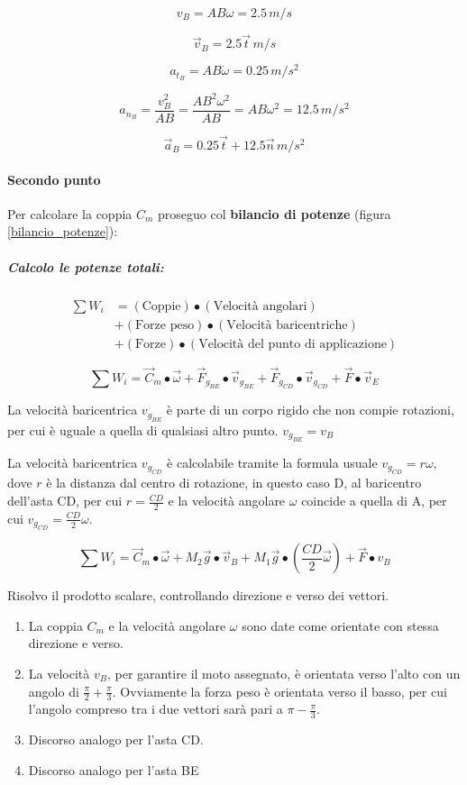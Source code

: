 \documentclass[main.tex]{subfiles}
\begin{document}
\[
  v_B = AB\omega = 2.5\,m/s
\]

\[
  \vec{v}_B = 2.5\vec{t}\,m/s
\]

\[
  a_{t_B} = AB\dot{\omega} = 0.25\,m/s^2
\]

\[
  a_{n_B} = \frac{v_B^2}{AB} = \frac{AB^2\omega^2}{AB} = AB\omega^2 = 12.5\,m/s^2
\]

\[
  \vec{a}_B = 0.25\vec{t} + 12.5\vec{n}\,m/s^2
\]

\paragraph{Secondo punto}
Per calcolare la coppia $C_m$ proseguo col \textbf{bilancio di potenze} (figura \ref{bilancio_potenze}):

\subparagraph{Calcolo le potenze totali:}

\begin{align*}
  \sum W_i &= (\text{Coppie})\bullet(\text{Velocità angolari})\\
  &+ (\text{Forze peso})\bullet(\text{Velocità baricentriche}) \\
  &+ (\text{Forze})\bullet(\text{Velocità del punto di applicazione})
\end{align*}

\[
  \sum W_i = \vec{C}_m\bullet\vec{\omega} + \vec{F}_{g_{BE}}\bullet \vec{v}_{g_{BE}} + \vec{F}_{g_{CD}}\bullet \vec{v}_{g_{CD}} + \vec{F}\bullet \vec{v}_E
\]

La velocità baricentrica $v_{g_{BE}}$ è parte di un corpo rigido che non compie rotazioni, per cui è uguale a quella di qualsiasi altro punto. $v_{g_{BE}} = v_B$

La velocità baricentrica $v_{g_{CD}}$ è calcolabile tramite la formula usuale $v_{g_{CD}} = r\omega$, dove $r$ è la distanza dal centro di rotazione, in questo caso D, al baricentro dell'asta CD, per cui $r = \frac{CD}{2}$ e la velocità angolare $\omega$ coincide a quella di A, per cui $v_{g_{CD}} = \frac{CD}{2}\omega$.

\[
  \sum W_i = \vec{C}_m\bullet\vec{\omega} + M_2\vec{g}\bullet \vec{v}_B + M_1\vec{g}\bullet( \frac{CD}{2}\vec{\omega})  + \vec{F}\bullet v_B
\]

Risolvo il prodotto scalare, controllando direzione e verso dei vettori.

\begin{enumerate}
  \item La coppia $C_m$ e la velocità angolare $\omega$ sono date come orientate con stessa direzione e verso.
  \item La velocità $v_B$, per garantire il moto assegnato, è orientata verso l'alto con un angolo di $\frac{\pi}{2}+\frac{\pi}{3}$. Ovviamente la forza peso è orientata verso il basso, per cui l'angolo compreso tra i due vettori sarà pari a $\pi - \frac{\pi}{3}$.
  \item Discorso analogo per l'asta CD.
  \item Discorso analogo per l'asta BE
\end{enumerate}
\end{document}
